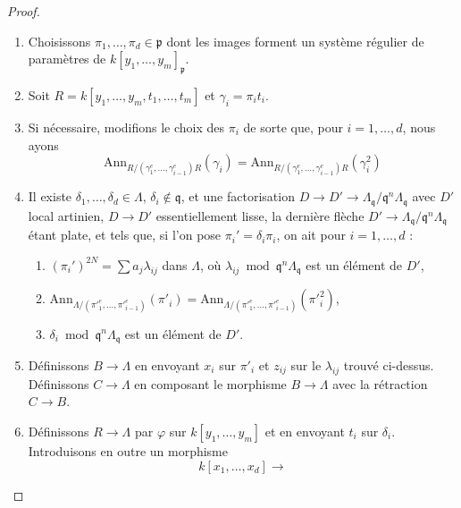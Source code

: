 \begin{proof}
\begin{enumerate}
$$$$
telle que la première flèche soit essentiellement lisse, la seconde plate,
que $E$ soit contenu dans $D$, et, avec $\mathfrak p = \varphi^{-1}(\mathfrak q)$,
que le morphisme $k[y_1, \ldots, y_m]_\mathfrak p \to \Lambda_\mathfrak q$ soit
plat et que $\mathfrak p \Lambda_\mathfrak q = \mathfrak q \Lambda_\mathfrak q$.
\item
\label{item-choose-pii}
Choisissons $\pi_1, \ldots, \pi_d \in \mathfrak p$ dont les images forment un
système régulier de paramètres de $k[y_1, \ldots, y_m]_\mathfrak p$.
\item
\label{item-set-R}
Soit $R = k[y_1, \ldots, y_m, t_1, \ldots, t_m]$ et $\gamma_i = \pi_i t_i$.
\item
\label{item-modify-pii}
Si nécessaire, modifions le choix des $\pi_i$ de sorte que,
pour $i = 1, \ldots, d$, nous ayons
$$
\text{Ann}_{R/(\gamma_1^e, \ldots, \gamma_{i - 1}^e)R}(\gamma_i)
=
\text{Ann}_{R/(\gamma_1^e, \ldots, \gamma_{i - 1}^e)R}(\gamma_i^2)
$$
\item
\label{item-choose-deltai}
Il existe $\delta_1, \ldots, \delta_d \in \Lambda$,
$\delta_i \not \in \mathfrak q$, et une factorisation
$D \to D' \to \Lambda_\mathfrak q/\mathfrak q^n\Lambda_\mathfrak q$
avec $D'$ local artinien, $D \to D'$ essentiellement lisse, la dernière flèche
$D' \to \Lambda_\mathfrak q/\mathfrak q^n\Lambda_\mathfrak q$
étant plate, et tels que, si l'on pose $\pi_i' = \delta_i \pi_i$, on ait pour
$i = 1, \ldots, d$ :
\begin{enumerate}
\item $(\pi_i')^{2N} = \sum a_j\lambda_{ij}$ dans $\Lambda$, où
$\lambda_{ij} \bmod \mathfrak q^n\Lambda_\mathfrak q$ est un élément de $D'$,
\item $\text{Ann}_{\Lambda/({\pi'}_1^e, \ldots, {\pi'}_{i - 1}^e)}({\pi'}_i) =
\text{Ann}_{\Lambda/({\pi'}_1^e, \ldots, {\pi'}_{i - 1}^e)}({\pi'}_i^2)$,
\item $\delta_i \bmod \mathfrak q^n\Lambda_\mathfrak q$ est un élément de $D'$.
\end{enumerate}
\item
\label{item-map-B-Lambda}
Définissons $B \to \Lambda$ en envoyant $x_i$ sur $\pi'_i$ et
$z_{ij}$ sur le $\lambda_{ij}$ trouvé ci-dessus. Définissons $C \to \Lambda$
en composant le morphisme $B \to \Lambda$ avec la rétraction $C \to B$.
\item
\label{item-set-map-R}
Définissons $R \to \Lambda$ par $\varphi$ sur $k[y_1, \ldots, y_m]$
et en envoyant $t_i$ sur $\delta_i$. Introduisons en outre un morphisme
$$
k[x_1, \ldots, x_d]
\longrightarrow
$$
\end{enumerate}
\end{proof}
